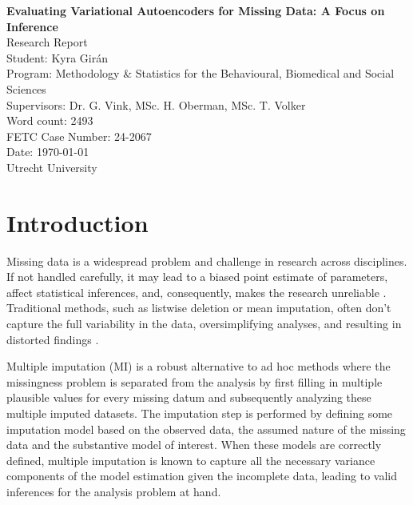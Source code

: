 \documentclass[10pt, a4paper]{article}
\begin{document}
\begin{titlepage}
    \centering
    \vspace{5cm}
    \LARGE\textbf{Evaluating Variational Autoencoders for Missing Data: A Focus on Inference}
    \\
    \vspace{1.5cm}
    \large Research Report
    \\
    \vfill
    \large Student: Kyra Girán
    \\
    \large Program: Methodology \& Statistics for the Behavioural, Biomedical and Social Sciences
    \\
    \large Supervisors: Dr. G. Vink, MSc. H. Oberman, MSc. T. Volker
    \\
    \large Word count: 2493
    \\
    \large FETC Case Number: 24-2067
    \\
    \vfill
    \large Date: \today
    \\
    \large Utrecht University
\end{titlepage}

\newpage

\section{Introduction}

Missing data is a widespread problem and challenge in research across disciplines. If not handled carefully, it may lead to a biased point estimate of parameters, affect statistical inferences, and, consequently, makes the research unreliable \parencite{vanBuuren2018}. 
Traditional methods, such as listwise deletion or mean imputation, often don’t capture the full variability in the data, oversimplifying analyses, and resulting in distorted findings \parencite{SchaferGraham2002}.

Multiple imputation (MI) is a robust alternative to ad hoc methods where the missingness problem is separated from the analysis by first filling in multiple plausible values for every missing datum and subsequently analyzing these multiple imputed datasets. The imputation step is performed by defining some imputation model based on the observed data, the assumed nature of the missing data and the substantive model of interest. When these models are correctly defined, multiple imputation is known to capture all the necessary variance components of the model estimation given the incomplete data, leading to valid inferences for the analysis problem at hand.  
\end{document}

